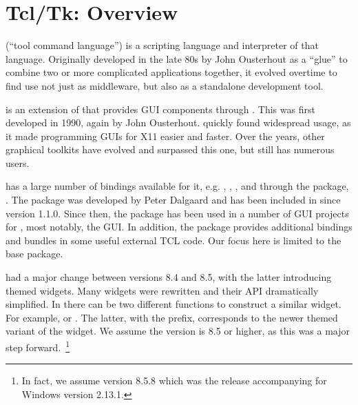  
\newcommand{\Event}[1]{$<$#1$>$}
\newcommand{\VirtualEvent}[1]{$<<$#1$>>$}



\chapter{Tcl/Tk: Overview}
\label{sec:tcltk:overview}



\TCL\/ (``tool command language'') is a scripting language and
interpreter of that language.  Originally developed in the late 80s by
John Ousterhout as a ``glue'' to combine two or more complicated
applications together, it evolved overtime to find use not just as
middleware, but also as a standalone development tool.

\TK{} is an extension of \TCL\/ that provides GUI components through \TCL.
This was first developed in 1990, again by John Ousterhout. \TK\/
quickly found widespread usage, as it made programming GUIs for X11
easier and faster. Over the years, other graphical toolkits have
evolved and surpassed this one, but \TK\/ still has numerous users.

\TK\/ has a large number of bindings available for it,
e.g. , , , and through
the  package, \R. The  package was developed by
Peter Dalgaard and has been included in \R\/ since version 1.1.0. Since then,
the package has been used in a number of GUI projects for \R, most
notably, the  GUI. In addition, the  package
provides additional bindings and bundles in some useful external TCL
code. Our focus here is limited to the base  package.

\TK\/ had a major change between versions 8.4 and 8.5, with the latter
introducing themed widgets. Many widgets were rewritten and their API
dramatically simplified. In  there can be two different
functions to construct a similar widget. For example,
 or . The latter, with the
 prefix, corresponds to the newer themed variant of the
widget. We assume the \TK\/ version is 8.5 or higher, as this was a
major step forward.~\footnote{In fact, we assume version 8.5.8 which
  was the release accompanying \R{} for Windows version 2.13.1.}


